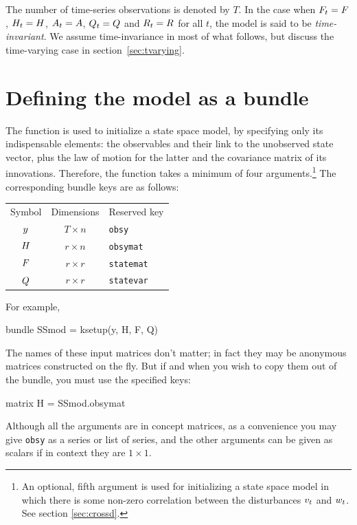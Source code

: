 The number of time-series observations is denoted by $T$.  In the case
when $F_t = F$, $H_t = H$,
$A_t = A$, $Q_t = Q$ and
$R_t = R$ for all $t$, the model is said to be
\emph{time-invariant}. We assume time-invariance in most of what
follows, but discuss the time-varying case in
section~\ref{sec:tvarying}.

\section{Defining the model as a bundle}
\label{sec:setup}

The  function is used to initialize a state space model,
by specifying only its indispensable elements: the observables and
their link to the unobserved state vector, plus the law of motion for
the latter and the covariance matrix of its innovations. Therefore,
the function takes a minimum of four arguments.\footnote{An optional,
  fifth argument is used for initializing a state space model in which
  there is some non-zero correlation between the disturbances
  $v_t$ and $w_t$. See section \ref{sec:crossd}.} The
corresponding bundle keys are as follows:

\begin{center}
\begin{tabular}{ccl}
Symbol & Dimensions & Reserved key \\[6pt]
$y$      & $T \times n$ & \texttt{obsy}\\
$H$      & $r \times n$ & \texttt{obsymat}\\
$F$    & $r \times r$ & \texttt{statemat}\\
$Q$      & $r \times r$ & \texttt{statevar}\\
\end{tabular}
\end{center}

For example,
\begin{code}
bundle SSmod = ksetup(y, H, F, Q)
\end{code} 

The names of these input matrices don't matter; in fact they may be
anonymous matrices constructed on the fly. But if and when you wish to
copy them out of the bundle, you must use the specified keys:
\begin{code}
matrix H = SSmod.obsymat
\end{code}

Although all the arguments are in concept matrices, as a convenience
you may give \texttt{obsy} as a series or list of series, and the
other arguments can be given as scalars if in context they are
$1 \times 1$.

